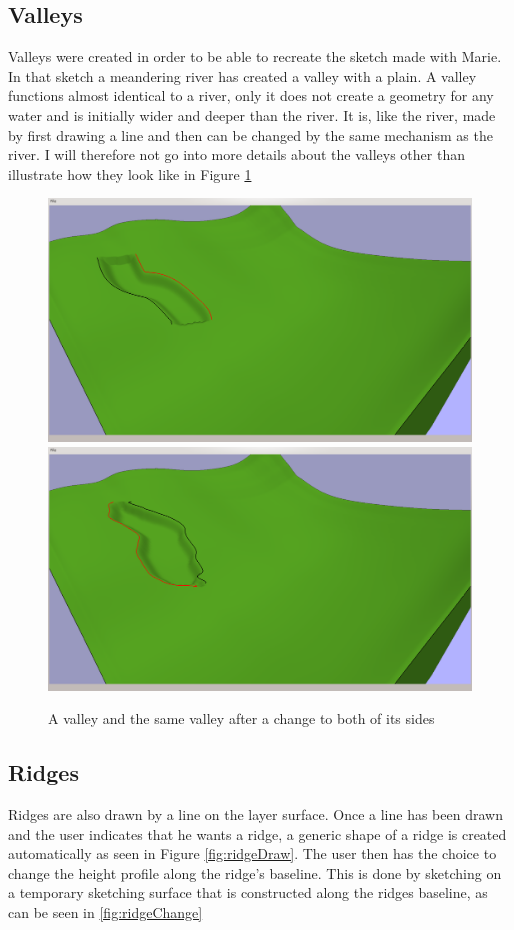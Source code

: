 \documentclass[a4paper,12pt]{report}
\begin{document}
\subsection{Valleys}
Valleys were created in order to be able to recreate the sketch made with Marie. In that sketch a meandering river has created a valley with a plain.
A valley functions almost identical to a river, only it does not create a geometry for any water and is initially wider and deeper than the river. It is, like the river, made by first drawing a line and then can be changed by the same mechanism as the river. I will therefore not go into more details about the valleys other than illustrate how they look like in Figure \ref{fig:valley}
\begin{figure}
\includegraphics[trim = 10mm 80mm 200mm 30mm, clip,width=.5\linewidth]{thesis/results/valleyMade.png}
\includegraphics[trim = 10mm 80mm 200mm 30mm, clip,width=.5\linewidth]{thesis/results/valleyChanged.png}
 \caption{A valley and the same valley after a change to both of its sides }
 \label{fig:valley}
\end{figure}

\subsection{Ridges}

Ridges are also drawn by a line on the layer surface. Once a line has been drawn and the user indicates that he wants a ridge, a generic shape of a ridge is created automatically as seen in Figure \ref{fig:ridgeDraw}. The user then has the choice to change the height profile along the ridge's baseline. This is done by sketching on a temporary sketching surface that is constructed along the ridges baseline, as can be seen in \ref{fig:ridgeChange}
\end{document}
